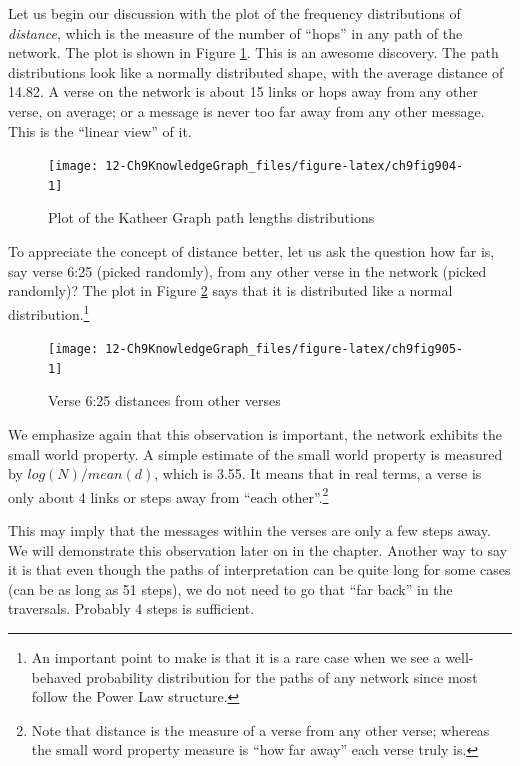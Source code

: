 \documentclass[
]{article}
\begin{document}
Let us begin our discussion with the plot of the frequency distributions of \emph{distance}, which is the measure of the number of ``hops'' in any path of the network. The plot is shown in Figure \ref{fig:ch9fig904}. This is an awesome discovery. The path distributions look like a normally distributed shape, with the average distance of 14.82. A verse on the network is about 15 links or hops away from any other verse, on average; or a message is never too far away from any other message. This is the ``linear view'' of it.

\begin{figure}

{\centering \texttt{[image: 12-Ch9KnowledgeGraph\_files/figure-latex/ch9fig904-1]} 

}

\caption{Plot of the Katheer Graph path lengths distributions}\label{fig:ch9fig904}
\end{figure}

To appreciate the concept of distance better, let us ask the question how far is, say verse 6:25 (picked randomly), from any other verse in the network (picked randomly)? The plot in Figure \ref{fig:ch9fig905} says that it is distributed like a normal distribution.\footnote{An important point to make is that it is a rare case when we see a well-behaved probability distribution for the paths of any network since most follow the Power Law structure.}

\begin{figure}

{\centering \texttt{[image: 12-Ch9KnowledgeGraph\_files/figure-latex/ch9fig905-1]} 

}

\caption{Verse 6:25 distances from other verses}\label{fig:ch9fig905}
\end{figure}

We emphasize again that this observation is important, the network exhibits the small world property. A simple estimate of the small world property is measured by \(log(N)/mean(d)\), which is 3.55. It means that in real terms, a verse is only about 4 links or steps away from ``each other''.\footnote{Note that distance is the measure of a verse from any other verse; whereas the small word property measure is ``how far away'' each verse truly is.}

This may imply that the messages within the verses are only a few steps away. We will demonstrate this observation later on in the chapter. Another way to say it is that even though the paths of interpretation can be quite long for some cases (can be as long as 51 steps), we do not need to go that ``far back'' in the traversals. Probably 4 steps is sufficient.
\end{document}
